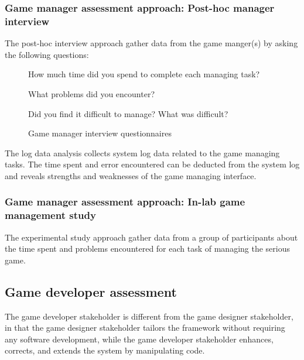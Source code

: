 \documentclass[11pt,oneside]{book}
\begin{document}
\subsubsection{Game manager assessment approach: Post-hoc manager interview}
\label{Post-hoc game manager interview}

The post-hoc interview approach gather data from the game manger(s) by asking the following questions:\\
 
\begin{figure}[ht!]
\begin{mybox}
\begin{compactenum}
\item How much time did you spend to complete each managing task?
\item What problems did you encounter?
\item Did you find it difficult to manage? What was difficult?\\
\end{compactenum}
\end{mybox}
\caption{Game manager interview questionnaires}
\label{fig:game-manager-interview}  
\end{figure}

The log data analysis collects system log data related to the game managing tasks. The time spent and error encountered can be deducted from the system log and reveals strengths and weaknesses of the game managing interface.

\subsubsection{Game manager assessment approach: In-lab game management study}
\label{In-lab game management study}

The experimental study approach gather data from a group of participants about the time spent and
problems encountered for each task of managing the serious game. 

\subsection{Game developer assessment}

The game developer stakeholder is different from the game designer stakeholder, in that the
game designer stakeholder tailors the framework without requiring any software
development, while the game developer stakeholder enhances, corrects, and extends the system by
manipulating code. 
\end{document}
